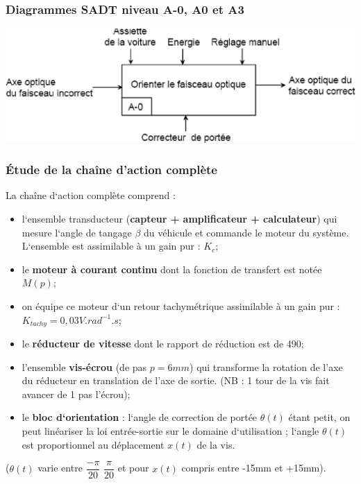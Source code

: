 \subsubsection{Diagrammes SADT niveau A-0, A0 et A3}
\begin{center}
 \includegraphics[width=.6\textwidth]{png/image3}
\end{center}

\subsubsection{Étude de la chaîne d’action complète}
La chaîne d‘action complète comprend :
\begin{itemize}
 \item l‘ensemble transducteur (\textbf{capteur + amplificateur + calculateur})
qui mesure l‘angle de tangage $\beta$ du véhicule et commande le moteur du
système. L‘ensemble est assimilable à un gain pur : $K_c$;
\item le \textbf{moteur à courant continu} dont la fonction de transfert est
notée $M(p)$;
\item on équipe ce moteur d‘un retour tachymétrique assimilable à un gain pur : 
   $K_{tachy}=0,03 V.rad^{-1}.s$;
\item le \textbf{réducteur de vitesse} dont le rapport de réduction est de 490;
\item l’ensemble \textbf{vis-écrou} (de pas $p = 6mm$) qui transforme la
rotation de l’axe du réducteur en translation de l’axe de sortie. (NB : 1
tour de la vis fait avancer de 1 pas l’écrou);
\item le \textbf{bloc d‘orientation} : l‘angle de correction de portée
$\theta(t)$ étant petit, on peut linéariser la loi entrée-sortie sur le
domaine d‘utilisation ; l‘angle $\theta(t)$ est proportionnel au déplacement
$x(t)$ de la vis.
\end{itemize}

($\theta(t)$ varie entre $\dfrac{-\pi}{20}$ $\dfrac{\pi}{20}$ et pour
$x(t)$ compris entre -15mm et +15mm).

